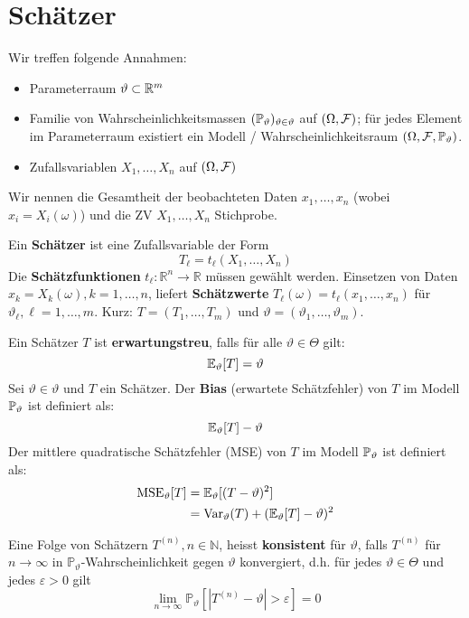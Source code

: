 \section{Schätzer}

Wir treffen folgende Annahmen:
\begin{itemize}
	\item Parameterraum \(\vartheta \subset \R^m\)
	\item Familie von Wahrscheinlichkeitsmassen \((\P_\vartheta)_{\vartheta \in \vartheta}\) auf \((\Omega, \F)\); 
    für jedes Element im Parameterraum existiert ein Modell / Wahrscheinlichkeitsraum $(\Omega, \F, \P_{\vartheta})$.
	\item Zufallsvariablen \(X_1, \ldots, X_n\) auf \((\Omega, \F)\)
\end{itemize}
Wir nennen die Gesamtheit der beobachteten Daten \(x_1, \ldots, x_n\) (wobei $x_i = X_i(\omega)$) und die ZV \(X_1, \ldots, X_n\) Stichprobe.
\begin{mainbox}{}
	Ein \textbf{Schätzer} ist eine Zufallsvariable der Form
$$
T_{\ell}=t_{\ell}(X_{1}, \ldots, X_{n})
$$
Die \textbf{Schätzfunktionen} $t_{\ell}: \mathbb{R}^{n} \rightarrow \mathbb{R}$ müssen gewählt werden. Einsetzen von Daten $x_{k}=X_{k}(\omega), k=1, \ldots, n$, liefert \textbf{Schätzwerte} $T_{\ell}(\omega)=t_{\ell}(x_{1}, \ldots, x_{n})$ für $\vartheta_{\ell}, \ell=1, \ldots, m$. Kurz: $T=(T_{1}, \ldots, T_{m})$ und $\vartheta=(\vartheta_{1}, \ldots, \vartheta_{m})$.
\end{mainbox}
Ein Schätzer \(T\) ist \textbf{erwartungstreu}, falls für alle \(\vartheta \in \Theta\) gilt:
\[\E_\vartheta [T] = \vartheta\]
Sei \(\vartheta \in \vartheta\) und \(T\) ein Schätzer. Der \textbf{Bias} (erwartete Schätzfehler) von \(T\) im Modell \(\P_\vartheta\) ist definiert als:
\[\E_\vartheta[T]-\vartheta\]
Der mittlere quadratische Schätzfehler (MSE) von \(T\) im Modell \(\P_\vartheta\) ist definiert als:
\begin{align*}
	\text{MSE}_\vartheta[T] & = \E_\vartheta[(T-\vartheta)^2]                    \\
	\ & = \Var_\vartheta(T) + (\E_\vartheta[T] - \vartheta)^2
\end{align*}

Eine Folge von Schätzern $T^{(n)}, n \in \mathbb{N}$, heisst \textbf{konsistent} für $\vartheta$, falls $T^{(n)}$ für $n \rightarrow \infty$ in $\mathbb{P}_{\vartheta}$-Wahrscheinlichkeit gegen $\vartheta$ konvergiert, d.h. für jedes $\vartheta \in \Theta$ und jedes $\varepsilon>0$ gilt
$$
\lim _{n \rightarrow \infty} \mathbb{P}_{\vartheta}[|T^{(n)}-\vartheta|>\varepsilon]=0
$$


